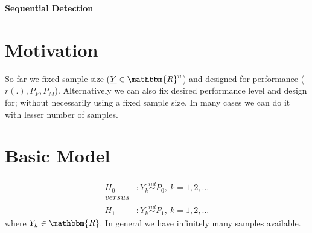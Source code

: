 \documentclass[12pt]{report}
\begin{document}
\maketitle

\begin{center}
{\Large \bf Sequential Detection   }
\end{center}
	
	

\section{Motivation}
So far we fixed sample size (${\underline{Y}} \in \mathbbm{R}^n$) and designed for performance ($r(.), P_F, P_M$). Alternatively we can also fix desired performance level and design for; without necessarily using a fixed sample size. In many cases we can do it with lesser number of samples. 


\section{Basic Model}

\begin{align*}
H_0 &: Y_k\stackrel{iid}\sim P_0,~k=1,2,\dots\\
versus\\
H_1 &: Y_k\stackrel{iid}\sim {P}_1,~k=1,2,\dots
\end{align*}
where $Y_k \in \mathbbm{R}$.
In general we have infinitely many samples available.
\end{document}
